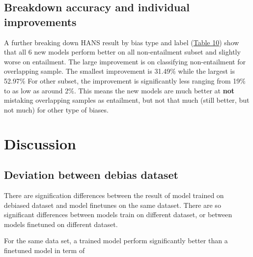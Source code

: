 \documentclass{article}
\begin{document}
\subsection{Breakdown accuracy and individual improvements}

A further breaking down HANS result by bias type and label (\hyperref[table10]{Table 10}) show that all 6 new models perform better on all non-entailment subset and slightly worse on entailment.
The large improvement is on classifying non-entailment for overlapping sample.
The smallest improvement is 31.49\% while the largest is 52.97\%
For other subset, the improvement is significantly less ranging from 19\% to as low as around 2\%.
This means the new models are much better at \textbf{not} mistaking overlapping samples as entailment, but not that much (still better, but not much) for other type of biases.

\section{Discussion}
\subsection{Deviation between debias dataset}
There are signification differences between the result of model trained on debiased dataset and model finetunes on the same dataset.
There are so significant differences between models train on different dataset, or between models finetuned on different dataset.

For the same data set, a trained model perform significantly better than a finetuned model in term of
\end{document}
